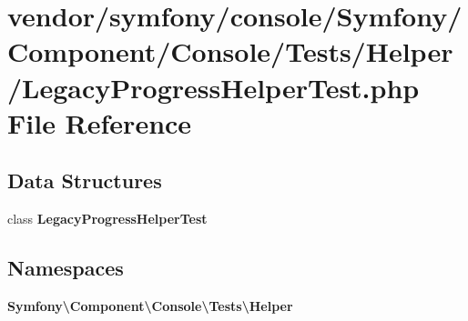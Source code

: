 \section{vendor/symfony/console/\+Symfony/\+Component/\+Console/\+Tests/\+Helper/\+Legacy\+Progress\+Helper\+Test.php File Reference}
\label{_legacy_progress_helper_test_8php}
\subsection*{Data Structures}
\begin{DoxyCompactItemize}
\item 
class {\bf Legacy\+Progress\+Helper\+Test}
\end{DoxyCompactItemize}
\subsection*{Namespaces}
\begin{DoxyCompactItemize}
\item 
 {\bf Symfony\textbackslash{}\+Component\textbackslash{}\+Console\textbackslash{}\+Tests\textbackslash{}\+Helper}
\end{DoxyCompactItemize}
